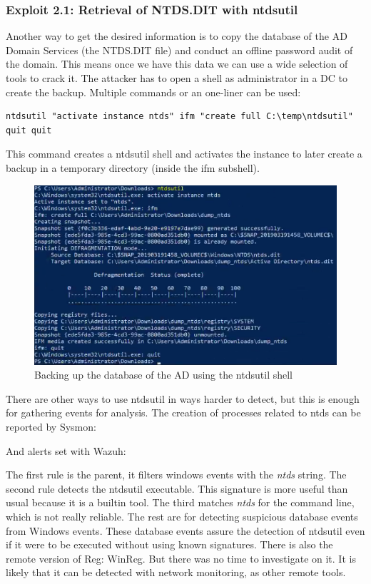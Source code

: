 \subsubsection{Exploit 2.1: Retrieval of NTDS.DIT with ntdsutil}
Another way to get the desired information is to copy the database of the AD Domain Services (the NTDS.DIT file) and conduct an offline password audit of the domain. This means once we have this data we can use a wide selection of tools to crack it\cite{ntdsdit_tools}\cite{extracting_ntds}\cite{ntds_powershell}.
\linej
\linej
The attacker has to open a shell as administrator in a DC to create the backup. Multiple commands or an one-liner can be used:
\begin{lstlisting}[style=PS]
ntdsutil "activate instance ntds" ifm "create full C:\temp\ntdsutil" quit quit
\end{lstlisting}
\linej
This command creates a ntdsutil shell and activates the instance to later create a backup in a temporary directory (inside the ifm subshell).
\begin{figure}[H]
	\centering
	\includegraphics[width=\textwidth]{figuras/ntdsutil.png}
	\caption{Backing up the database of the AD using the ntdsutil shell}
\end{figure}
\linej
There are other ways to use ntdsutil in ways harder to detect\cite{more_dumps}, but this is enough for gathering events for analysis.
\linej
\linej
The creation of processes related to ntds can be reported by Sysmon:

\linej
And alerts set with Wazuh:
\label{ntdsutil_detection}

\linej
The first rule is the parent, it filters windows events with the \textit{ntds} string.
\linej
The second rule detects the ntdsutil executable. This signature is more useful than usual because it is a builtin tool. The third matches \textit{ntds} for the command line, which is not really reliable.
\linej
The rest are for detecting suspicious database events from Windows events. These database events assure the detection of ntdsutil even if it were to be executed without using known signatures.
\linej
\linej
There is also the remote version of Reg: WinReg. But there was no time to investigate on it. It is likely that it can be detected with network monitoring, as other remote tools.

